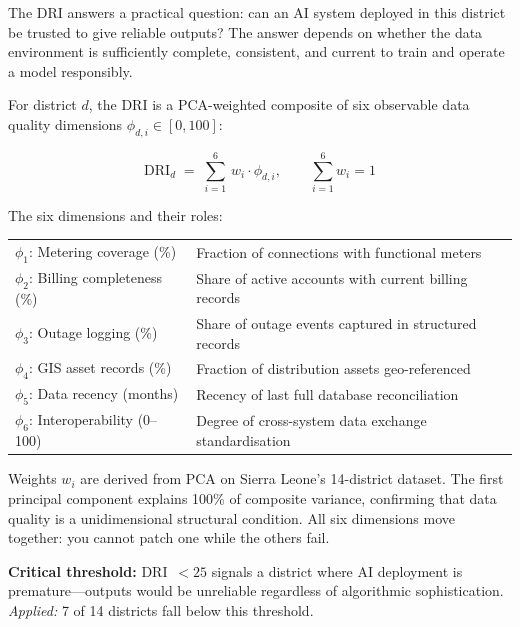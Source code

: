 \documentclass[preprint,12pt]{elsarticle}
\begin{document}
\begin{tcolorbox}[metDRI,
  title={Metric 1: Data Readiness Index (DRI) ---
         Is this district ready for AI?}]

The DRI answers a practical question: can an AI system
deployed in this district be trusted to give reliable outputs?
The answer depends on whether the data environment is
sufficiently complete, consistent, and current to train
and operate a model responsibly.

For district $d$, the DRI is a PCA-weighted composite of six
observable data quality dimensions $\phi_{d,i} \in [0,100]$:

\begin{equation}
\mathrm{DRI}_d \;=\; \sum_{i=1}^{6}\, w_i \cdot \phi_{d,i},
\qquad \sum_{i=1}^{6} w_i = 1
\label{eq:dri}
\end{equation}

\noindent The six dimensions and their roles:

\medskip
\begin{tabularx}{\linewidth}{@{}lX@{}}
$\phi_1$: Metering coverage (\%) &
  Fraction of connections with functional meters \\
$\phi_2$: Billing completeness (\%) &
  Share of active accounts with current billing records \\
$\phi_3$: Outage logging (\%) &
  Share of outage events captured in structured records \\
$\phi_4$: GIS asset records (\%) &
  Fraction of distribution assets geo-referenced \\
$\phi_5$: Data recency (months) &
  Recency of last full database reconciliation \\
$\phi_6$: Interoperability (0--100) &
  Degree of cross-system data exchange standardisation \\
\end{tabularx}

\medskip
Weights $w_i$ are derived from PCA on Sierra Leone's 14-district
dataset. The first principal component explains 100\% of
composite variance, confirming that data quality is a
unidimensional structural condition. All six dimensions
move together: you cannot patch one while the others fail.

\medskip
\textbf{Critical threshold:} DRI~$< 25$ signals a district
where AI deployment is premature---outputs would be unreliable
regardless of algorithmic sophistication.
\textit{Applied:} 7 of 14 districts fall below this threshold.

\end{tcolorbox}
\end{document}

